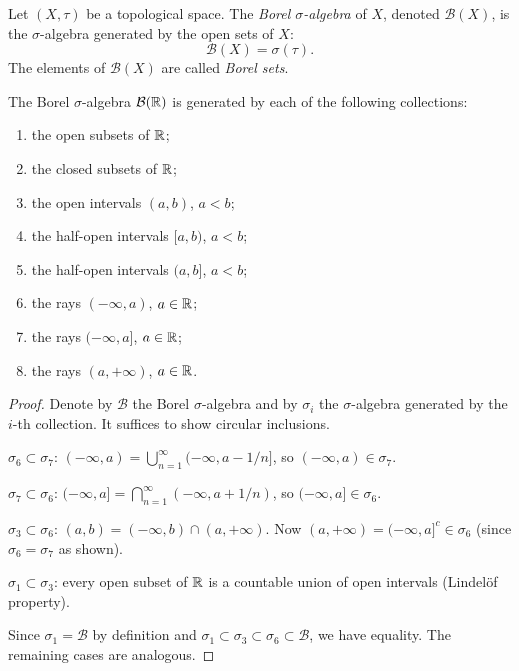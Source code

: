 \begin{definition}
Let $(X, \tau)$ be a topological space. The \emph{Borel $\sigma$-algebra} of $X$,
denoted $\mathcal{B}(X)$, is the $\sigma$-algebra generated by the open sets of $X$:
\[
\mathcal{B}(X) = \sigma(\tau).
\]
The elements of $\mathcal{B}(X)$ are called \emph{Borel sets}.
\end{definition}

\begin{theorem}
\label{thm:borel_generators}
The Borel $\sigma$-algebra $\mathcal{B}(\mathbb{R})$ is generated by each of the following
collections:
\begin{enumerate}
    \item the open subsets of $\mathbb{R}$;
    \item the closed subsets of $\mathbb{R}$;
    \item the open intervals $(a, b)$, $a < b$;
    \item the half-open intervals $[a, b)$, $a < b$;
    \item the half-open intervals $(a, b]$, $a < b$;
    \item the rays $(-\infty, a)$, $a \in \mathbb{R}$;
    \item the rays $(-\infty, a]$, $a \in \mathbb{R}$;
    \item the rays $(a, +\infty)$, $a \in \mathbb{R}$.
\end{enumerate}
\end{theorem}

\begin{proof}
Denote by $\mathcal{B}$ the Borel $\sigma$-algebra and by $\sigma_i$ the
$\sigma$-algebra generated by the $i$-th collection. It suffices to show
circular inclusions.

$\sigma_6 \subset \sigma_7$: $(-\infty, a) = \bigcup_{n=1}^{\infty}
(-\infty, a - 1/n]$, so $(-\infty, a) \in \sigma_7$.

$\sigma_7 \subset \sigma_6$: $(-\infty, a] = \bigcap_{n=1}^{\infty}
(-\infty, a + 1/n)$, so $(-\infty, a] \in \sigma_6$.

$\sigma_3 \subset \sigma_6$: $(a, b) = (-\infty, b) \cap (a, +\infty)$. Now
$(a, +\infty) = (-\infty, a]^c \in \sigma_6$ (since $\sigma_6 = \sigma_7$ as shown).

$\sigma_1 \subset \sigma_3$: every open subset of $\mathbb{R}$ is a countable union of
open intervals (Lindel\"of property).

Since $\sigma_1 = \mathcal{B}$ by definition and
$\sigma_1 \subset \sigma_3 \subset \sigma_6 \subset \mathcal{B}$, we have equality.
The remaining cases are analogous.
\end{proof}

